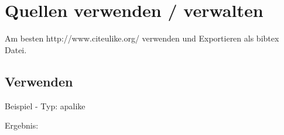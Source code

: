 
\chapter{Quellen verwenden / verwalten}

Am besten http://www.citeulike.org/ verwenden und Exportieren als bibtex Datei.


\section{Verwenden}

Beispiel - Typ: apalike


Ergebnis: \cite{haase}